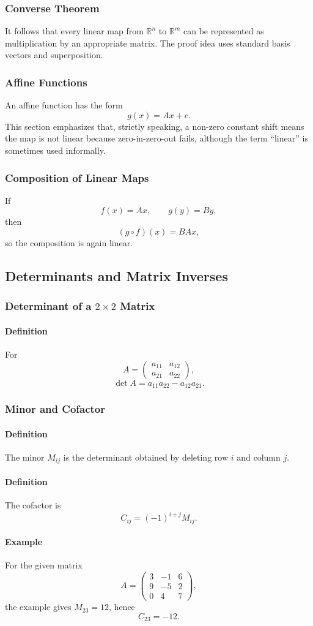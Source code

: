 \documentclass[12pt]{article}
\newcommand{\Definition}{\paragraph{Definition}}
\newcommand{\Example}{\paragraph{Example}}
\begin{document}
\subsubsection{Converse Theorem}
It follows that every linear map from $\mathbb R^n$ to $\mathbb R^m$ can be represented as multiplication by an appropriate matrix. The proof idea uses standard basis vectors and superposition.

\subsubsection{Affine Functions}
An affine function has the form
\[
g(x)=Ax+c.
\]
This section emphasizes that, strictly speaking, a non-zero constant shift means the map is not linear because zero-in-zero-out fails, although the term ``linear'' is sometimes used informally.

\subsubsection{Composition of Linear Maps}
If
\[
f(x)=Ax,\qquad g(y)=By,
\]
then
\[
(g\circ f)(x)=BAx,
\]
so the composition is again linear.

\subsection{Determinants and Matrix Inverses}
\subsubsection{Determinant of a $2\times2$ Matrix}
\Definition For
\[
A=\begin{pmatrix}a_{11}&a_{12}\\a_{21}&a_{22}\end{pmatrix},
\]
\[
\det A=a_{11}a_{22}-a_{12}a_{21}.
\]

\subsubsection{Minor and Cofactor}
\Definition The minor $M_{ij}$ is the determinant obtained by deleting row $i$ and column $j$.

\Definition The cofactor is
\[
C_{ij}=(-1)^{i+j}M_{ij}.
\]

\Example For the given matrix
\[
A=\begin{pmatrix}
3&-1&6\\
9&-5&2\\
0&4&7
\end{pmatrix},
\]
the example gives $M_{23}=12$, hence
\[
C_{23}=-12.
\]
\end{document}
